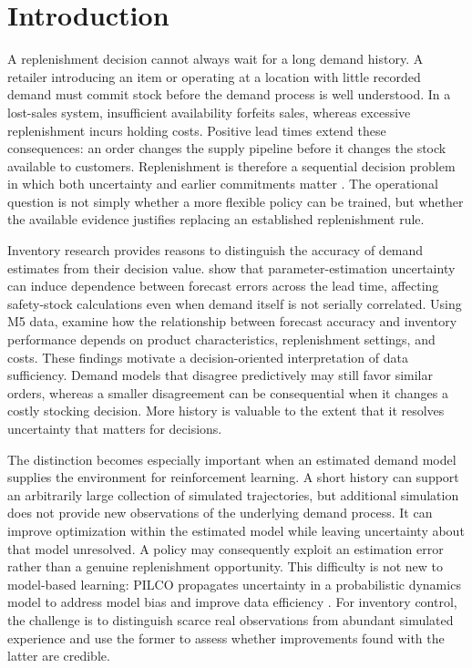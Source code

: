 \section{Introduction}
\label{sec:introduction}

A replenishment decision cannot always wait for a long demand history. A retailer introducing an item or operating at a location with little recorded demand must commit stock before the demand process is well understood. In a lost-sales system, insufficient availability forfeits sales, whereas excessive replenishment incurs holding costs. Positive lead times extend these consequences: an order changes the supply pipeline before it changes the stock available to customers. Replenishment is therefore a sequential decision problem in which both uncertainty and earlier commitments matter \citep{bijvank2011}. The operational question is not simply whether a more flexible policy can be trained, but whether the available evidence justifies replacing an established replenishment rule.

Inventory research provides reasons to distinguish the accuracy of demand estimates from their decision value. \citet{prak2017} show that parameter-estimation uncertainty can induce dependence between forecast errors across the lead time, affecting safety-stock calculations even when demand itself is not serially correlated. Using M5 data, \citet{theodorou2025} examine how the relationship between forecast accuracy and inventory performance depends on product characteristics, replenishment settings, and costs. These findings motivate a decision-oriented interpretation of data sufficiency. Demand models that disagree predictively may still favor similar orders, whereas a smaller disagreement can be consequential when it changes a costly stocking decision. More history is valuable to the extent that it resolves uncertainty that matters for decisions.

The distinction becomes especially important when an estimated demand model supplies the environment for reinforcement learning. A short history can support an arbitrarily large collection of simulated trajectories, but additional simulation does not provide new observations of the underlying demand process. It can improve optimization within the estimated model while leaving uncertainty about that model unresolved. A policy may consequently exploit an estimation error rather than a genuine replenishment opportunity. This difficulty is not new to model-based learning: PILCO propagates uncertainty in a probabilistic dynamics model to address model bias and improve data efficiency \citep{deisenroth2011}. For inventory control, the challenge is to distinguish scarce real observations from abundant simulated experience and use the former to assess whether improvements found with the latter are credible.

